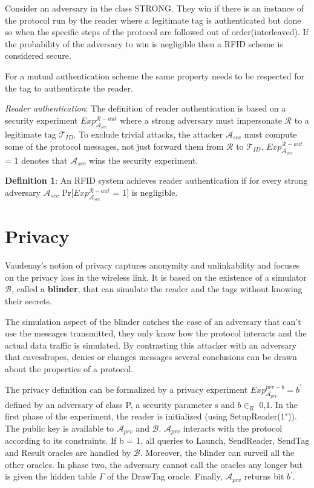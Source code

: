    Consider an adversary in the class STRONG. They win if there is an instance of the protocol run
    by the reader where a legitimate tag is authenticated but done so when the specific steps of the 
    protocol are followed out of order(interleaved). If the probability of the adversary to win is 
    negligible then a RFID scheme is considered secure.

    For a mutual authentication scheme the same property needs to be respected for the tag to authenticate
    the reader.

    \textit{Reader authentication}: The definition of reader authentication is based on a security experiment $Exp_{\mathcal{A}_{sec}}^{\mathcal{R}-aut}$
    where a strong adversary must impersonate $\mathcal{R}$ to a legitimate tag $\mathcal{T}_{ID}$. To exclude trivial attacks, the attacker $\mathcal{A}_{sec}$
    must compute some of the protocol messages, not just forward them from $\mathcal{R}$ to $\mathcal{T}_{ID}$. $Exp_{\mathcal{A}_{sec}}^{\mathcal{R}-aut}$ = 1
    denotes that $\mathcal{A}_{sec}$ wins the security experiment.

    \textbf{Definition 1}: An RFID system achieves reader authentication if for every strong adversary $\mathcal{A}_{sec}$ Pr[$Exp_{\mathcal{A}_{sec}}^{\mathcal{R}-aut}$ = 1]
    is negligible.

    \section{Privacy}

    Vaudenay's notion of privacy captures anonymity and unlinkability and focuses on the privacy loss in the wireless link. It is based on 
    the existence of a simulator $\mathcal{B}$, called a \textbf{blinder}, that can simulate the reader and the tags without knowing their secrets.
    
    The simulation aspect of the blinder catches the case of an adversary that can't use the messages transmitted, they only know how the protocol
    interacts and the actual data traffic is simulated. By contrasting this attacker with an adversary that eavesdropes, denies or changes messages
    several conclusions can be drawn about the properties of a protocol.

    The privacy definition can be formalized by a privacy experiment $Exp_{\mathcal{A}_{prv}}^{prv-b} = b^{'}$ defined by an adversary of class P, a
    security parameter s and $b \in_{R}$ {0,1}. In the first phase of the experiment, the reader is initialized (using SetupReader($1^s$)). 
    The public key is available to $\mathcal{A}_{prv}$ and $\mathcal{B}$. $\mathcal{A}_{prv}$ interacts with the protocol according to its constraints.
    If b = 1, all queries to Launch, SendReader, SendTag and Result oracles are handled by $\mathcal{B}$. Moreover, the blinder can surveil all the other
    oracles. In phase two, the adversary cannot call the oracles any longer but is given the hidden table $\Gamma$ of the DrawTag oracle. Finally, 
    $\mathcal{A}_{prv}$ returns bit $b^{'}$.

